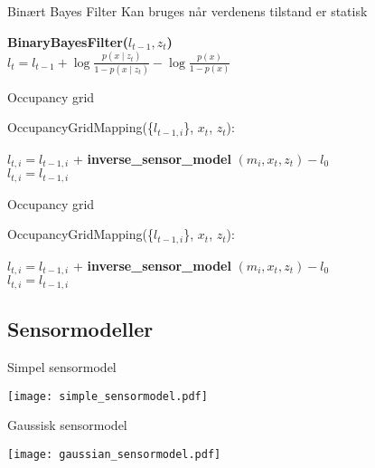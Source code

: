 \begin{frame}{Binært Bayes Filter}
Kan bruges når verdenens tilstand er statisk

\begin{algorithm}[H]
\textbf{BinaryBayesFilter($l_{t-1}, z_t$)} \\
\Indp $l_t = l_{t-1} + \log \frac{p(x \mid z_t)}{1-p(x \mid z_t)} - \log \frac{p(x)}{1-p(x)}$ \\
\end{algorithm}
\end{frame}

\begin{frame}{Occupancy grid}
\begin{algorithm}[H]
OccupancyGridMapping(\{$l_{t-1,i}$\}, $x_t$, $z_t$):

{
{ $ l_{t,i} = l_{t-1,i} $ + \textbf{inverse\_sensor\_model} $( m_i, x_t, z_t ) - l_0$\\ }
{ $ l_{t,i} = l_{t-1,i}  $\\ }
}
\end{algorithm}
\end{frame}

\begin{frame}{Occupancy grid}
\begin{algorithm}[H]
OccupancyGridMapping(\{$l_{t-1,i}$\}, $x_t$, $z_t$):

{
{ $ l_{t,i} = l_{t-1,i} $ + \textbf{inverse\_sensor\_model} $( m_i, x_t, z_t ) - l_0$\\ }
{ $ l_{t,i} = l_{t-1,i}  $\\ }
}
\end{algorithm}
\end{frame}

\subsection{Sensormodeller}
\begin{frame}{Simpel sensormodel}

\texttt{[image: simple\_sensormodel.pdf]}
\end{frame}

  
\begin{frame}{Gaussisk sensormodel}

\texttt{[image: gaussian\_sensormodel.pdf]}
\end{frame}

